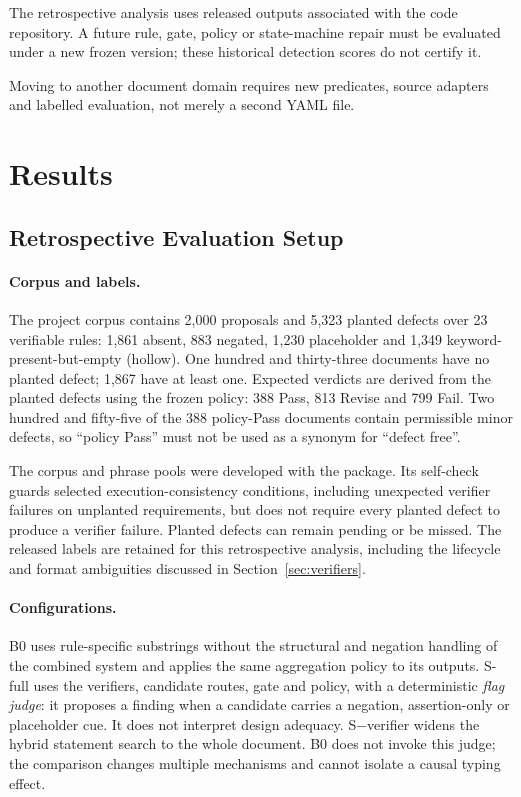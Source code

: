 \documentclass[computers,article,submit,moreauthors]{Definitions/mdpi}
\begin{document}
The retrospective analysis uses released outputs associated with the code repository. A future rule, gate, policy or state-machine repair must be evaluated under a new frozen version; these historical detection scores do not certify it.

Moving to another document domain requires new predicates, source adapters and labelled evaluation, not merely a second YAML file.

\section{Results}\label{sec:results}

\subsection{Retrospective Evaluation Setup}

\paragraph{Corpus and labels.}
The project corpus contains 2,000 proposals and 5,323 planted defects over 23 verifiable rules: 1,861 absent, 883 negated, 1,230 placeholder and 1,349 keyword-present-but-empty (hollow). One hundred and thirty-three documents have no planted defect; 1,867 have at least one. Expected verdicts are derived from the planted defects using the frozen policy: 388 Pass, 813 Revise and 799 Fail. Two hundred and fifty-five of the 388 policy-Pass documents contain permissible minor defects, so ``policy Pass'' must not be used as a synonym for ``defect free''.

The corpus and phrase pools were developed with the package. Its self-check guards selected execution-consistency conditions, including unexpected verifier failures on unplanted requirements, but does not require every planted defect to produce a verifier failure. Planted defects can remain pending or be missed. The released labels are retained for this retrospective analysis, including the lifecycle and format ambiguities discussed in Section~\ref{sec:verifiers}.

\paragraph{Configurations.}
B0 uses rule-specific substrings without the structural and negation handling of the combined system and applies the same aggregation policy to its outputs. S-full uses the verifiers, candidate routes, gate and policy, with a deterministic \emph{flag judge}: it proposes a finding when a candidate carries a negation, assertion-only or placeholder cue. It does not interpret design adequacy. S$-$verifier widens the hybrid statement search to the whole document. B0 does not invoke this judge; the comparison changes multiple mechanisms and cannot isolate a causal typing effect.
\end{document}
